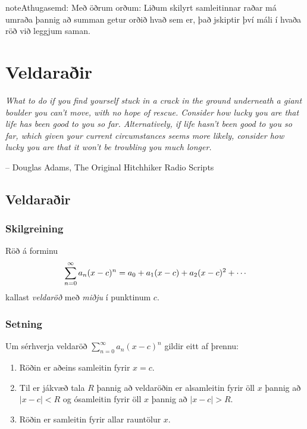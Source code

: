 \documentclass[a4paper,10pt,icelandic]{sphinxmanual}
\begin{document}
\begin{notice}{note}{Athugasemd:}
Með öðrum orðum:
Liðum skilyrt samleitinnar raðar má umraða þannig að summan getur orðið
hvað sem er, það jskiptir því máli í hvaða röð við leggjum saman.
\end{notice}


\chapter{Veldaraðir}
\label{kafli10::doc}\label{kafli10:veldarair}
\emph{What to do if you find yourself stuck in a crack in the ground underneath
a giant boulder you can't move, with no hope of rescue. Consider how lucky
you are that life has been good to you so far. Alternatively, if life hasn't
been good to you so far, which given your current circumstances seems more
likely, consider how lucky you are that it won't be troubling you much longer.}

-- Douglas Adams, The Original Hitchhiker Radio Scripts


\section{Veldaraðir}
\label{kafli10:index-1}\label{kafli10:id1}

\subsection{Skilgreining}
\label{kafli10:skilgreining}
Röð á forminu
\begin{gather}
\begin{split}\sum_{n=0}^\infty a_n(x-c)^n=a_0+a_1(x-c)+a_2(x-c)^2+\cdots\end{split}\notag
\end{gather}
kallast \textit{veldaröð} með \textit{miðju} í punktinum \(c\).


\subsection{Setning}
\label{kafli10:setning}\label{kafli10:setning-samleitnigeisli}
Um sérhverja veldaröð \(\sum_{n=0}^\infty a_n(x-c)^n\) gildir eitt
af þrennu:
\begin{enumerate}
\item {} 
Röðin er aðeins samleitin fyrir \(x=c\).

\item {} 
Til er jákvæð tala \(R\) þannig að veldaröðin er alsamleitin
fyrir öll \(x\) þannig að \(|x-c|<R\) og ósamleitin fyrir
öll \(x\) þannig að \(|x-c|>R\).

\item {} 
Röðin er samleitin fyrir allar rauntölur \(x\).

\end{enumerate}
\end{document}
